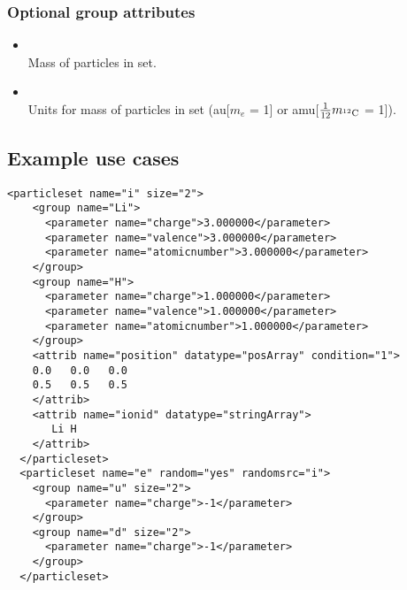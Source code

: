 \subsubsection{Optional group attributes}

\begin{itemize}
\item {} \\
Mass of particles in set.
\end{itemize}

\begin{itemize}
\item {} \\
Units for mass of particles in set (au[$m_e$ = 1] or amu[$\frac{1}{12}m_{\rm ^{12}C}$ = 1]).
\end{itemize}



\subsection{Example use cases}
\begin{minipage}{\linewidth}
\begin{lstlisting}[style=QMCPXML,caption=Particleset elements for ions and electrons randomizing electron start positions.]
  <particleset name="i" size="2">
    <group name="Li">
      <parameter name="charge">3.000000</parameter>
      <parameter name="valence">3.000000</parameter>
      <parameter name="atomicnumber">3.000000</parameter>
    </group>
    <group name="H">
      <parameter name="charge">1.000000</parameter>
      <parameter name="valence">1.000000</parameter>
      <parameter name="atomicnumber">1.000000</parameter>
    </group>
    <attrib name="position" datatype="posArray" condition="1">
    0.0   0.0   0.0
    0.5   0.5   0.5
    </attrib>
    <attrib name="ionid" datatype="stringArray">
       Li H
    </attrib>
  </particleset>
  <particleset name="e" random="yes" randomsrc="i">
    <group name="u" size="2">
      <parameter name="charge">-1</parameter>
    </group>
    <group name="d" size="2">
      <parameter name="charge">-1</parameter>
    </group>
  </particleset>                 
\end{lstlisting}
\end{minipage}

